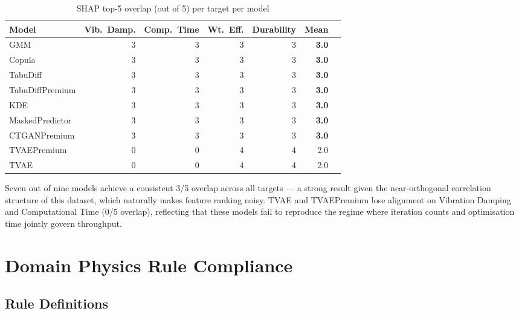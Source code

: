 \documentclass[12pt,a4paper]{article}
\begin{document}
\begin{table}[H]
\centering
\caption{SHAP top-5 overlap (out of 5) per target per model}
\label{tab:shap_overlap}
\renewcommand{\arraystretch}{1.25}
\begin{tabular}{lrrrrrr}
\toprule
\textbf{Model} & \textbf{Vib.\ Damp.} & \textbf{Comp.\ Time} & \textbf{Wt.\ Eff.} & \textbf{Durability} & \textbf{Mean} \\
\midrule
GMM             & 3 & 3 & 3 & 3 & \textbf{3.0} \\
Copula          & 3 & 3 & 3 & 3 & \textbf{3.0} \\
TabuDiff        & 3 & 3 & 3 & 3 & \textbf{3.0} \\
TabuDiffPremium & 3 & 3 & 3 & 3 & \textbf{3.0} \\
KDE             & 3 & 3 & 3 & 3 & \textbf{3.0} \\
MaskedPredictor & 3 & 3 & 3 & 3 & \textbf{3.0} \\
CTGANPremium    & 3 & 3 & 3 & 3 & \textbf{3.0} \\
TVAEPremium     & 0 & 0 & 4 & 4 & 2.0 \\
TVAE            & 0 & 0 & 4 & 4 & 2.0 \\
\bottomrule
\end{tabular}
\end{table}

\begin{tcolorbox}[insightbox, title={Key Observation}]
Seven out of nine models achieve a consistent 3/5 overlap across all targets --- a strong result given the near-orthogonal correlation structure of this dataset, which naturally makes feature ranking noisy. TVAE and TVAEPremium lose alignment on Vibration Damping and Computational Time (0/5 overlap), reflecting that these models fail to reproduce the regime where iteration counts and optimisation time jointly govern throughput.
\end{tcolorbox}

\section{Domain Physics Rule Compliance}

\subsection{Rule Definitions}
\end{document}
